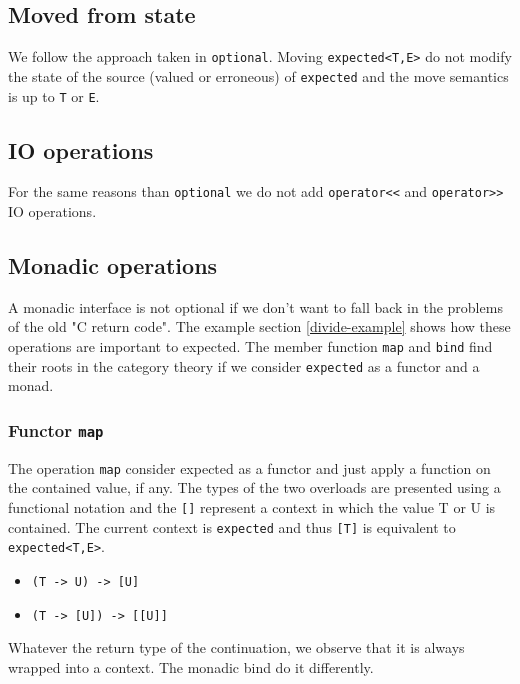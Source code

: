\documentclass[a4paper,10pt]{article}
\newcommand{\cpp}[1]{\lstinline{#1}}
\begin{document}
\subsection{Moved from state}

We follow the approach taken in \cpp{optional}\cite{OptionalRev4}. Moving \cpp{expected<T,E>} do not modify the state of the source (valued or erroneous) of \cpp{expected} and the move semantics is up to \cpp{T} or \cpp{E}.

\subsection{IO operations}

For the same reasons than \cpp{optional}\cite{OptionalRev4} we do not add \cpp{operator<<} and \cpp{operator>>} IO operations.

\subsection{Monadic operations}
\label{monadic-operations}

A monadic interface is not optional if we don't want to fall back in the problems of the old "C return code". The example section \ref{divide-example} shows how these operations are important to expected. The member function \cpp{map} and \cpp{bind} find their roots in the category theory if we consider \cpp{expected} as a functor and a monad.

\subsubsection{Functor \cpp{map}}

The operation \cpp{map} consider expected as a functor and just apply a function on the contained value, if any. The types of the two overloads are presented using a functional notation and the \cpp{[]} represent a context in which the value T or U is contained. The current context is \cpp{expected} and thus \cpp{[T]} is equivalent to \cpp{expected<T,E>}.

\begin{itemize}
\item \cpp{(T -> U) -> [U]}
\item \cpp{(T -> [U]) -> [[U]]}
\end{itemize}

Whatever the return type of the continuation, we observe that it is always wrapped into a context. The monadic bind do it differently.
\end{document}
